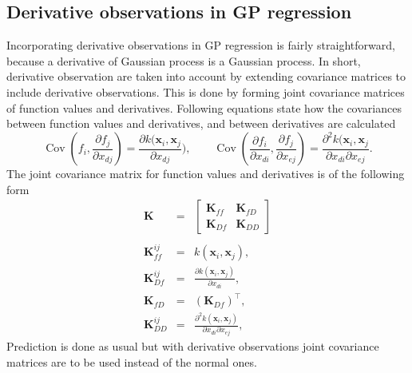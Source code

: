 \documentclass[twoside,11pt]{article}
\DeclareMathOperator{\COV}{Cov}
\begin{document}
\subsection{Derivative observations in GP regression}

Incorporating derivative observations in GP regression is fairly
straightforward, because a derivative of Gaussian process is a
Gaussian process. In short, derivative observation are taken into
account by extending covariance matrices to include derivative
observations. This is done by forming joint covariance matrices of
function values and derivatives. Following equations
\citep{Rasmussen+Williams:2006} state how the covariances between
function values and derivatives, and between derivatives are
calculated
% 
\begin{equation}
  \COV(f_i,\frac{\partial f_j}{\partial x_{dj}}) = \frac{\partial k(\textbf{x}_i,\textbf{x}_j}{\partial x_{dj}}), \qquad
  \COV(\frac{\partial f_i}{\partial x_{di}},\frac{\partial f_j}{\partial x_{ej}}) = \frac{\partial^2 k(\textbf{x}_i,\textbf{x}_j}{\partial x_{di}\partial x_{ej}}.\nonumber
\end{equation}
% 
The joint covariance matrix for function values and derivatives is of
the following form
% 
\begin{eqnarray}
  \textbf{K} &=&
  \left[
    \begin{array}{cc}
      \textbf{K}_{ff} & \textbf{K}_{fD}\\
      \textbf{K}_{Df}& \textbf{K}_{DD}
    \end{array}\nonumber
  \right]\\
  \nonumber\\
  \textbf{K}_{ff}^{ij} &=& k(\textbf{x}_i,\textbf{x}_j),\nonumber\\
  \textbf{K}_{Df}^{ij} &=& \frac{\partial k(\textbf{x}_i,\textbf{x}_j)}{\partial x_{di}},\nonumber\\
  \textbf{K}_{fD} &=& (\textbf{K}_{Df})^\top,\label{DerKder3} \nonumber\\
  \textbf{K}_{DD}^{ij} &=& \frac{\partial^2 k(\textbf{x}_i,\textbf{x}_j)}{\partial x_{di} \partial x_{ej}},\nonumber
\end{eqnarray}
% 
Prediction is done as usual but with derivative observations joint
covariance matrices are to be used instead of the normal ones.
\end{document}
